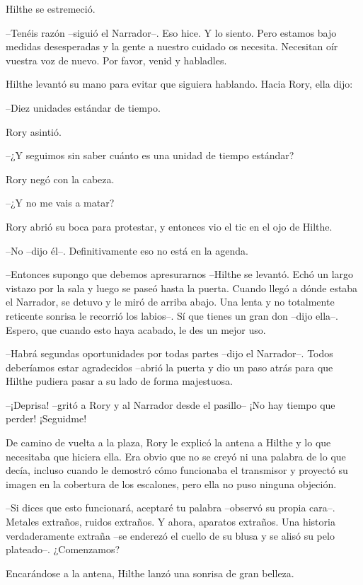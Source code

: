 {Hilthe se estremeció.}

{--Tenéis razón --siguió el Narrador--. Eso hice. Y lo siento. Pero
	estamos bajo medidas desesperadas y la gente a nuestro cuidado os
	necesita. Necesitan oír vuestra voz de nuevo. Por favor, venid y
habladles.}

{Hilthe levantó su mano para evitar que siguiera hablando. Hacia Rory,
ella dijo:}

{--Diez unidades estándar de tiempo.}

{Rory asintió.}

{--¿Y seguimos sin saber cuánto es una unidad de tiempo estándar?}

{Rory negó con la cabeza.}

{--¿Y no me vais a matar?}

{Rory abrió su boca para protestar, y entonces vio el tic en el ojo de
Hilthe.}

{--No --dijo él--. Definitivamente eso no está en la agenda.}

{--Entonces supongo que debemos apresurarnos --Hilthe se levantó. Echó
	un largo vistazo por la sala y luego se paseó hasta la puerta. Cuando
	llegó a dónde estaba el Narrador, se detuvo y le miró de arriba abajo.
	Una lenta y no totalmente reticente sonrisa le recorrió los labios--. Sí
	que tienes un gran don --dijo ella--. Espero, que cuando esto haya
acabado, le des un mejor uso.}

{--Habrá segundas oportunidades por todas partes --dijo el Narrador--.
	Todos deberíamos estar agradecidos --abrió la puerta y dio un paso atrás
para que Hilthe pudiera pasar a su lado de forma majestuosa.}

{--¡Deprisa! --gritó a Rory y al Narrador desde el pasillo-- ¡No hay
tiempo que perder! ¡Seguidme!}

\mbox{}

{De camino de vuelta a la plaza, Rory le explicó la antena a Hilthe y lo
	que necesitaba que hiciera ella. Era obvio que no se creyó ni una
	palabra de lo que decía, incluso cuando le demostró cómo funcionaba el
	transmisor y proyectó su imagen en la cobertura de los escalones, pero
ella no puso ninguna objeción.}

{--Si dices que esto funcionará, aceptaré tu palabra --observó su
	propia cara--. Metales extraños, ruidos extraños. Y ahora, aparatos
	extraños. Una historia verdaderamente extraña --se enderezó el cuello de
su blusa y se alisó su pelo plateado--. ¿Comenzamos?}

{Encarándose a la antena, Hilthe lanzó una sonrisa de gran belleza.}

